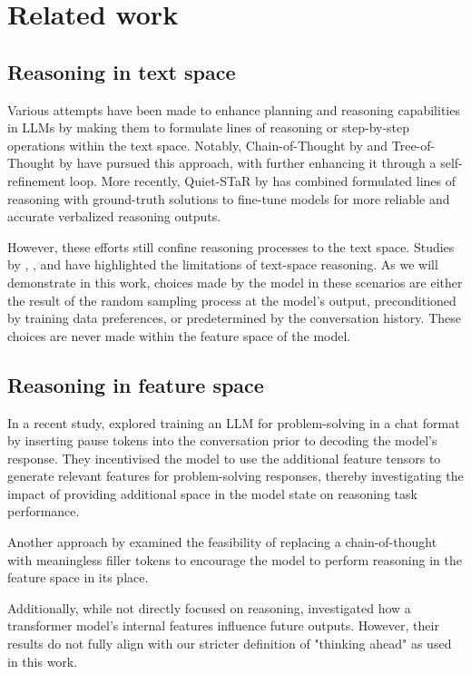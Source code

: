 \documentclass{article}
\begin{document}
\section{Related work}
\subsection{Reasoning in text space}
Various attempts have been made to enhance planning and reasoning capabilities in LLMs by making them to formulate lines of reasoning or step-by-step operations within the text space. Notably, Chain-of-Thought by \cite{wei2022chain} and Tree-of-Thought by \cite{yao2023tree} have pursued this approach, with \cite{madaan2023selfrefine} further enhancing it through a self-refinement loop. More recently, Quiet-STaR by \cite{zelikman2024quietstar} has combined formulated lines of reasoning with ground-truth solutions to fine-tune models for more reliable and accurate verbalized reasoning outputs.

However, these efforts still confine reasoning processes to the text space. Studies by \cite{huang2024large}, \cite{tyen2024llms}, and \cite{turpin2023language} have highlighted the limitations of text-space reasoning. As we will demonstrate in this work, choices made by the model in these scenarios are either the result of the random sampling process at the model's output, preconditioned by training data preferences, or predetermined by the conversation history. These choices are never made within the feature space of the model.

\subsection{Reasoning in feature space}
In a recent study, \cite{goyal2024think} explored training an LLM for problem-solving in a chat format by inserting pause tokens into the conversation prior to decoding the model's response. They incentivised the model to use the additional feature tensors to generate relevant features for problem-solving responses, thereby investigating the impact of providing additional space in the model state on reasoning task performance.

Another approach by \cite{pfau2024lets} examined the feasibility of replacing a chain-of-thought with meaningless filler tokens to encourage the model to perform reasoning in the feature space in its place.

Additionally, while not directly focused on reasoning, \cite{wu2024language} investigated how a transformer model's internal features influence future outputs. However, their results do not fully align with our stricter definition of "thinking ahead" as used in this work.
\end{document}
